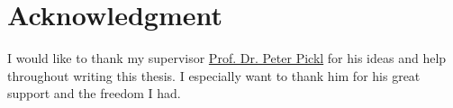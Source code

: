 \cleardoublepage
{} \label{acknowledgment}

\chapter*{Acknowledgment}

I would like to thank my supervisor \href{http://www.mathematik.uni-muenchen.de/personen/professoren/pickl/index.html}{Prof. Dr. Peter Pickl} for his ideas and help throughout writing this thesis. I especially want to thank him for his great support and the freedom I had.

